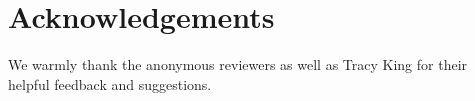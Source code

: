 \documentclass[11pt]{article}
\begin{document}
\section*{Acknowledgements}
We warmly thank the anonymous reviewers as well as Tracy King for their helpful feedback and suggestions. 




















\appendix
\end{document}

